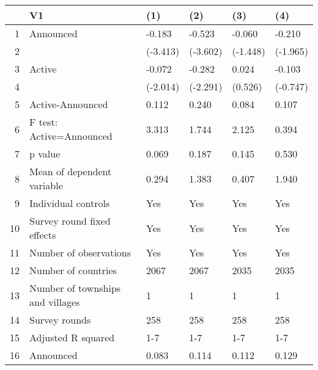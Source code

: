 \begin{table}[ht]
\centering
\begin{tabular}{rlllll}
  \hline
 & V1 & (1) & (2) & (3) & (4) \\ 
  \hline
1 & Announced & -0.183 & -0.523 & -0.060 & -0.210 \\ 
  2 &  & (-3.413) & (-3.602) & (-1.448) & (-1.965) \\ 
  3 & Active & -0.072 & -0.282 & 0.024 & -0.103 \\ 
  4 &  & (-2.014) & (-2.291) & (0.526) & (-0.747) \\ 
  5 & Active-Announced & 0.112 & 0.240 & 0.084 & 0.107 \\ 
  6 & F test: Active=Announced & 3.313 & 1.744 & 2.125 & 0.394 \\ 
  7 & p value & 0.069 & 0.187 & 0.145 & 0.530 \\ 
  8 & Mean of dependent variable & 0.294 & 1.383 & 0.407 & 1.940 \\ 
  9 & Individual controls & Yes & Yes & Yes & Yes \\ 
  10 & Survey round fixed effects & Yes & Yes & Yes & Yes \\ 
  11 & Number of observations & Yes & Yes & Yes & Yes \\ 
  12 & Number of countries & 2067 & 2067 & 2035 & 2035 \\ 
  13 & Number of townships and villages & 1 & 1 & 1 & 1 \\ 
  14 & Survey rounds & 258 & 258 & 258 & 258 \\ 
  15 & Adjusted R squared & 1-7 & 1-7 & 1-7 & 1-7 \\ 
  16 & Announced & 0.083 & 0.114 & 0.112 & 0.129 \\ 
   \hline
\end{tabular}
\end{table}
